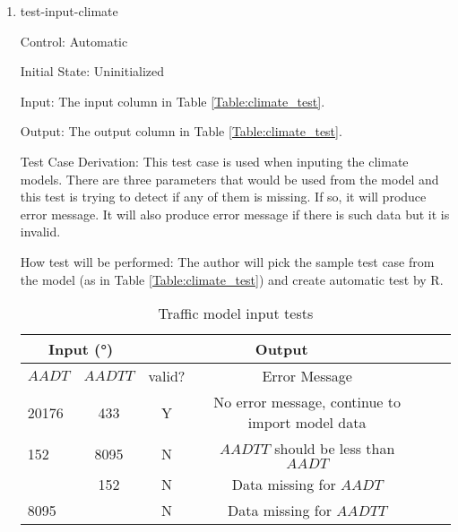 \documentclass[12pt, titlepage]{article}
\begin{document}
\begin{enumerate}

\item{test-input-climate\\}

Control: Automatic
					
Initial State: Uninitialized
					
Input: The input column in Table \ref{Table:climate_test}.
					
Output: The output column in Table \ref{Table:climate_test}. 

Test Case Derivation: This test case is used when inputing the climate models. There are three parameters that would be used from the model and this test is trying to detect if any of them is missing. If so, it will produce error message. It will also produce error message if there is such data but it is invalid. 
					
How test will be performed: The author will pick the sample test case from the model (as in Table \ref{Table:climate_test}) and create automatic test by R.



\begin{center}
\begin{table}[h]
\resizebox{\textwidth}{!}
{ %
    \begin{tabular}{ lc|cccc }
    \hline
      \multicolumn{2}{c|}{Input (\si[per-mode=symbol] {\degree}) }                            & \multicolumn{2}{c}{Output} \\ 
    
    \hline

        $AADT$   &   $AADTT$   &   valid?   &   Error Message \\ \hline
    
       20176  & 433 &   Y  &  No error message, continue to import model data          \\      \hline
       152  & 8095 &   N  & $AADTT$ should be less than $AADT$                        \\      \hline
         & 152 &   N  & Data missing for $AADT$                        \\      \hline
       8095 & &   N  & Data missing for $AADTT$                        \\      \hline
    
    \end{tabular} %
}
\caption{Traffic model input tests}
\label{Table:traffic_test}
\end{table}
\end{center}


\end{enumerate}
\end{document}
